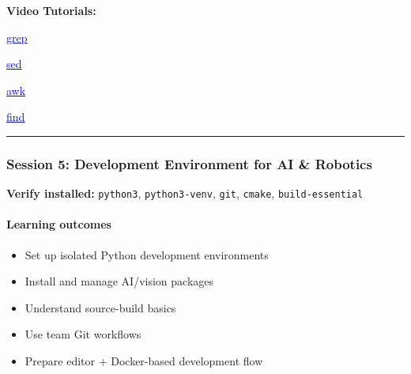 \documentclass[
  english,
  paper=a4,
  oneside  ,captions=tableheading
]{scrartcl}
\providecommand{\tightlist}{%
  \setlength{\itemsep}{0pt}\setlength{\parskip}{0pt}}
\renewenvironment{quote}{\begin{customblockquote}\list{}{\rightmargin=0em\leftmargin=0em}%
\item\relax\color{blockquote-text}\ignorespaces}{\unskip\unskip\endlist\end{customblockquote}}
\begin{document}
\textbf{Video Tutorials:}

%
  \par\vspace{0.5ex}%
  \href{https://youtu.be/N05sWPgj-44?si=RqN-cKCBSae4bvK7}{\textcolor{blue}{\underline{\faLink\quad grep}}}%
  \par\vspace{0.5ex}%

%
  \par\vspace{0.5ex}%
  \href{https://youtu.be/EACe7aiGczw?si=q8Hyf9d1VgsO-uj2}{\textcolor{blue}{\underline{\faLink\quad sed}}}%
  \par\vspace{0.5ex}%

%
  \par\vspace{0.5ex}%
  \href{https://youtu.be/9YOZmI-zWok?si=Larx5zKGgMMSrsn-}{\textcolor{blue}{\underline{\faLink\quad awk}}}%
  \par\vspace{0.5ex}%

%
  \par\vspace{0.5ex}%
  \href{https://youtu.be/BZ5gsFiIKOQ?si=WEDUXPu6DCi2anNL}{\textcolor{blue}{\underline{\faLink\quad find}}}%
  \par\vspace{0.5ex}%

\begin{center}\rule{0.5\linewidth}{0.5pt}\end{center}

\subsubsection{Session 5: Development Environment for AI \&
Robotics}\label{session-5-development-environment-for-ai-robotics}

\begin{quote}
\textbf{Verify installed:} \texttt{python3}, \texttt{python3-venv},
\texttt{git}, \texttt{cmake}, \texttt{build-essential}
\end{quote}

\paragraph{Learning outcomes}\label{learning-outcomes-4}

\begin{itemize}
\tightlist
\item
  Set up isolated Python development environments
\item
  Install and manage AI/vision packages
\item
  Understand source-build basics
\item
  Use team Git workflows
\item
  Prepare editor + Docker-based development flow
\end{itemize}
\end{document}
